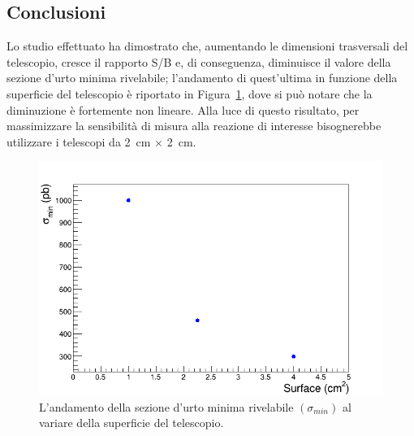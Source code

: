 \subsection*{Conclusioni}


Lo studio effettuato ha dimostrato che, aumentando le dimensioni trasversali del telescopio, cresce il rapporto S/B e, di conseguenza, diminuisce il valore della sezione d'urto minima rivelabile; l'andamento di quest'ultima in funzione della superficie del telescopio è riportato in Figura~\ref{fig:rapporto_segnale_fondo}, dove si può notare che la diminuzione è fortemente non lineare.
Alla luce di questo risultato, per massimizzare la sensibilità di misura alla reazione di interesse bisognerebbe utilizzare i telescopi da 2~cm $\times$ 2~cm.

\begin{figure} [!t]
	\centering
	\includegraphics[scale=0.5]{Grafici_Tesi2/Granularitanew/sigma_min.png}
	\caption{L'andamento della sezione d'urto minima rivelabile $(\sigma_{min})$ al variare della superficie del telescopio.} \label{fig:rapporto_segnale_fondo}
\end{figure}

